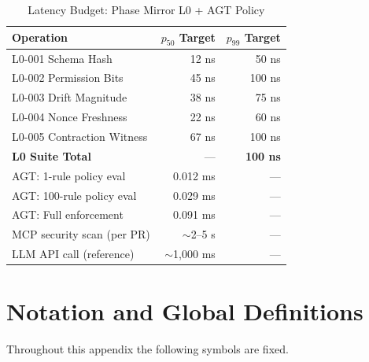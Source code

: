 \documentclass[12pt,a4paper]{article}
\theoremstyle{definition}
\theoremstyle{remark}
\begin{document}
\begin{table}[H]
\centering
\caption{Latency Budget: Phase Mirror L0 + AGT Policy}
\begin{tabular}{lrr}
\toprule
\textbf{Operation} & \textbf{$p_{50}$ Target} & \textbf{$p_{99}$ Target} \\
\midrule
L0-001 Schema Hash           & 12 ns   & 50 ns  \\
L0-002 Permission Bits       & 45 ns   & 100 ns \\
L0-003 Drift Magnitude       & 38 ns   & 75 ns  \\
L0-004 Nonce Freshness       & 22 ns   & 60 ns  \\
L0-005 Contraction Witness   & 67 ns   & 100 ns \\
\textbf{L0 Suite Total}      & ---     & \textbf{100 ns} \\
\midrule
AGT: 1-rule policy eval      & 0.012 ms & --- \\
AGT: 100-rule policy eval    & 0.029 ms & --- \\
AGT: Full enforcement        & 0.091 ms & --- \\
MCP security scan (per PR)   & $\sim$2--5 s & --- \\
\midrule
LLM API call (reference)     & $\sim$1,000 ms & --- \\
\bottomrule
\end{tabular}
\end{table}

\section{Notation and Global Definitions}
\label{sec:notation}

Throughout this appendix the following symbols are fixed.
\end{document}
